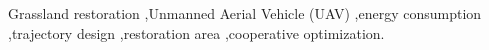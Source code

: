\documentclass[preprint,5pt]{elsarticle}
\begin{document}
\begin{frontmatter}
\begin{abstract}
\end{abstract}


\begin{keyword}
Grassland restoration \sep Unmanned Aerial Vehicle (UAV) \sep energy consumption \sep trajectory design \sep restoration area \sep cooperative optimization.
\end{keyword}

\end{frontmatter}


\end{document}
